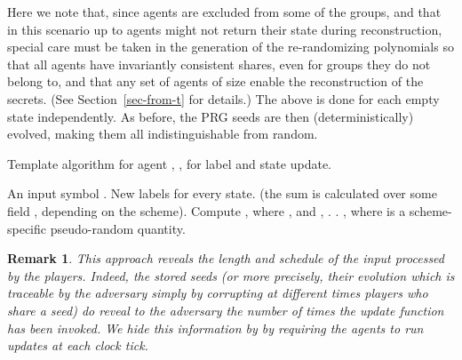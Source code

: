 \documentclass[letterpaper,11pt]{article}
\newcommand{\ignore}[1]{}
               {}
\newtheorem{remark}[theorem]{Remark}
\begin{document}
Here we note that, since agents are excluded from some of the groups,
and that in this scenario up to  agents might not return their
state during reconstruction, special care must be taken in the
generation of the re-randomizing polynomials so that all agents have
invariantly consistent shares, even for groups they do not belong to,
and that any set of agents of size  enable the reconstruction of
the secrets.  (See Section~\ref{sec-from-t} for details.)
The above is done for each empty state independently.
As before, the PRG seeds are then (deterministically) evolved,
making them all indistinguishable from random.

\ignore{

{\bf -reconstruction using additively homomorphic encryption.}  In our third scenario, we will make use of additively homomorphic public-key encryption, such as Goldwasser-Micali~\cite{C:GolMic88} (for  reconstruction) or Paillier~\cite{EC:Paillier98}.

Our main idea here is to encrypt the state labels with the public key known to the dealer (or reconstructible by a threshold of players).  The output is then obtained by running a secure multiparty computation on the player's current states.   Now, during FSA computation, since the labels are encrypted, they hide the state update history, and empty states can be simply labeled with encryptions of  (for  reconstruction) and with Shamir shares of  derived from a single seed.

} 

\begin{algorithm*} [htb]
\caption{Template algorithm for agent , , for label 
and state update.\label{alg:updating}}
\label{algo:calc}
\begin{algorithmic}[1]
\REQUIRE An input symbol .
\ENSURE New labels for every state.
\STATE  (the sum is calculated over some field , depending on the scheme).
\ENDIF
{}
\STATE Compute  , where , and , .
\STATE .
\STATE , where  is a scheme-specific pseudo-random quantity.
\ENDFOR
\ENDFOR
\end{algorithmic}
\end{algorithm*}

\begin{remark}
{\em This approach reveals the length and schedule of the input
 processed by the players.  Indeed, the stored seeds (or more
precisely, their evolution which is traceable by the adversary simply
by corrupting at different times players who share a seed) do reveal
to the adversary the number of times the update function has been invoked.
We hide this information by
by requiring the agents to run updates at each
clock tick.
} 
\end{remark}
\end{document}
